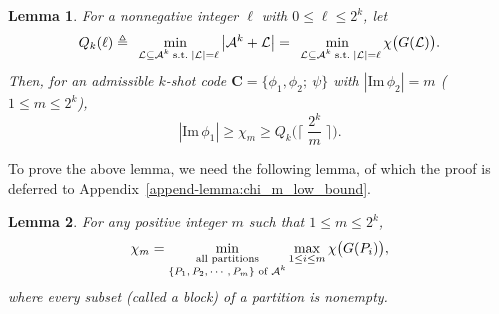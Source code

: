 \documentclass[11pt,draftclsnofoot,onecolumn]{IEEEtran}
\newtheorem{lemma}{Lemma}
\newcommand{\mbC}{\mathbf{C}}
\def\Im{\mathrm{Im}}
\begin{document}
\begin{lemma}\label{lemma:N_relat_code_color_set}
For a nonnegative integer $\ell$ with  $0\leq \ell  \leq 2^{k}$, let
\begin{align}\label{def:Q_k(l)}
Q_{k}(\ell)\triangleq\min_{\substack{\;\;\mathcal{L}\subseteq\mathcal{A}^{k}\;\text{\rm s.t.}\;|\mathcal{L}|
=\ell}}\big|\mathcal{A}^{k}+ \mathcal{L}\big|=\min_{\substack{\;\;\mathcal{L}\subseteq\mathcal{A}^{k}\;\text{\rm s.t.}\;|\mathcal{L}|
=\ell}}\chi\big(G(\mathcal{L})\big).
\end{align}
Then, for an  admissible $k$-shot  code $\mbC=\big\{\phi_1,\phi_2;~\psi\big\}$ with $|\Im\, \phi_{2}|=m$ \rm{(}$1\leq m\leq 2^{k}$\rm{)},
\begin{equation*}
|\Im\,\phi_{1}|\geq\chi_{m}\geq Q_{k}\Big(\Big\lceil\;\frac{2^{k}}{m}\;\Big\rceil\Big).\label{eq:N_lemma:relat_code_color_set}
	\end{equation*}
\end{lemma}

To prove the above lemma, we need the following lemma, of which the proof is deferred to Appendix~\ref{append-lemma:chi_m_low_bound}.

\begin{lemma}\label{lemma:chi_m_low_bound}
For any positive integer $m$ such that $1\leq m\leq 2^k$,
\begin{equation*}\label{eq:chi_m=min_max_color}
	\chi_{m}{\color{blue}}=\min_{\substack{\text{ \rm{all partitions} }\\\text{$\{P_1,P_2,\cdots,P_m\}$ \rm{of} $\mathcal{A}^{k}$}}}\max_{1\leq i\leq m}\chi\big(G(P_i)\big),
\end{equation*}
where every subset {\rm{(}}called a block{\rm{)}} of a  partition is nonempty.
\end{lemma}
\end{document}
